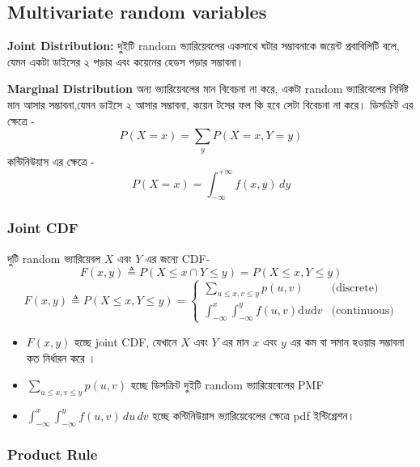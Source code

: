 \documentclass[graybox, envcountchap, twocolumn]{styles/svmult}
\begin{document}
\subsection{Multivariate random variables}
\textbf{Joint Distribution: }
{\bengalifont দুইটি random ভ্যারিয়েবলের একসাথে ঘটার সম্ভাবনাকে জয়েন্ট প্রবাবিলিটি বলে, যেমন একটা ডাইসের ২ পড়ার এবং কয়েনের হেডস পড়ার সম্ভাবনা। }

\textbf{Marginal Distribution}
{\bengalifont অন্য ভ্যারিয়েবলের মান বিবেচনা না করে, একটা random ভ্যারিবেলের নির্দিষ্ট মান আসার সম্ভাবনা,যেমন ডাইসে ২ আসার সম্ভাবনা, কয়েন টসের ফল কি হবে সেটা বিবেচনা না করে।
ডিসক্রিট এর ক্ষেত্রে - }
\begin{equation}
    P(X = x) = \sum_y P(X = x, Y = y)
\end{equation} 
{\bengalifont কন্টিনিউয়াস এর ক্ষেত্রে }- 
\begin{equation}
    P(X = x) = \int_{-\infty}^{+\infty} f(x, y) \, dy
\end{equation}

\subsubsection{Joint CDF}
{\bengalifont দুটি random ভ্যারিয়েবল $X$ এবং $Y$ এর জন্যে } CDF- 
\[
F(x,y) \triangleq P(X \leq x \cap Y \leq y)=P(X \leq x , Y \leq y)
\]
\begin{equation}
F(x,y) \triangleq P(X \leq x, Y \leq y) = \begin{cases}
\sum_{u \leq x, v \leq y} p(u,v) & \text{(discrete)} \\
\int_{-\infty}^{x} \int_{-\infty}^{y} f(u,v)\mathrm{d}u \mathrm{d}v & \text{(continuous)}
\end{cases}
\end{equation}

\begin{itemize}
    \item $F(x, y)$ { \bengalifont হচ্ছে joint CDF, {\bengalifont যেখানে  $X$ এবং $Y$ এর মান $x$ এবং $y$ এর কম বা সমান হওয়ার সম্ভাবনা কত নির্ধারন করে ।}}
    \item $\sum_{u \leq x, v \leq y} p(u, v)$ {\bengalifont হচ্ছে ডিসক্রিট দুইটি random ভ্যারিয়েবেলের PMF}
    \item $\int_{-\infty}^{x} \int_{-\infty}^{y} f(u, v) \, du \, dv$ {\bengalifont হচ্ছে কন্টিনিউয়াস ভ্যারিয়েবেলের ক্ষেত্রে pdf ইন্টিগ্রেশন।}
\end{itemize}

\subsubsection{Product Rule}
\end{document}
